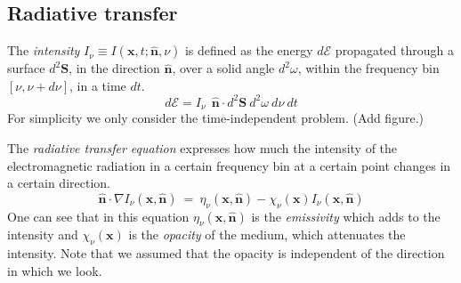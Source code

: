 \documentclass[]{article}
\begin{document}
\subsection{Radiative transfer}

The \emph{intensity} $I_{\nu}\equiv I( \textbf{x},t;\hat{\textbf{n}},\nu)$ is defined as the energy $d\mathcal{E}$ propagated through a surface $d^{2}\textbf{S}$, in the direction $\hat{\textbf{n}}$, over a solid angle $d^{2}\omega$, within the frequency bin $[\nu,\nu+d\nu]$, in a time $dt$.
\begin{equation}
	d\mathcal{E} = I_{\nu} \ \ \hat{\textbf{n}} \cdot d^{2}\textbf{S} \ d^{2}\omega \ d\nu \ dt
\end{equation}
For simplicity we only consider the time-independent problem. (Add figure.)

\bigskip

The \emph{radiative transfer equation} expresses how much the intensity of the electromagnetic radiation in a certain frequency bin at a certain point changes in a certain direction.
\begin{equation}
\hat{\textbf{n}} \cdot \nabla I_{\nu}(\textbf{x},\hat{\textbf{n}}) \ = \ \eta_{\nu}(\textbf{x},\hat{\textbf{n}}) - \chi_{\nu}(\textbf{x}) I_{\nu}(\textbf{x},\hat{\textbf{n}})
\end{equation}
One can see that in this equation $\eta_{\nu}(\textbf{x},\hat{\textbf{n}})$ is the \emph{emissivity} which adds to the intensity and $\chi_{\nu}(\textbf{x})$ is the \emph{opacity} of the medium, which attenuates the intensity. Note that we assumed that the opacity is independent of the direction in which we look.

\bigskip
\end{document}
